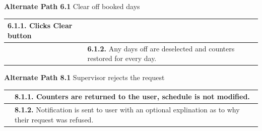 \documentclass[letterpaper,12pt]{report}
\begin{document}
{\centering \textbf{Alternate Path 6.1}
\linebreak Clear off booked days
\begin{center}
\xuchead
\begin{tabular}{| p{8.5cm} | p{8.5cm} |}
\hline
\textbf{6.1.1.} Clicks Clear button & \\
\hline
& \textbf{6.1.2.} Any days off are deselected and counters restored for every day.  \\
\hline
\end{tabular}
\end{center}

\pagebreak
\centering \textbf{Alternate Path 8.1}
\linebreak Supervisor rejects the request
\begin{center}
\xuchead
\begin{tabular}{| p{8.5cm} | p{8.5cm} |}
\hline
& \textbf{8.1.1.} Counters are returned to the user, schedule is not modified. \\
\hline
& \textbf{8.1.2.} Notification is sent to user with an optional explination as to why their request was refused. \\
\hline
\end{tabular}
\end{center}

}

\pagebreak
\end{document}

